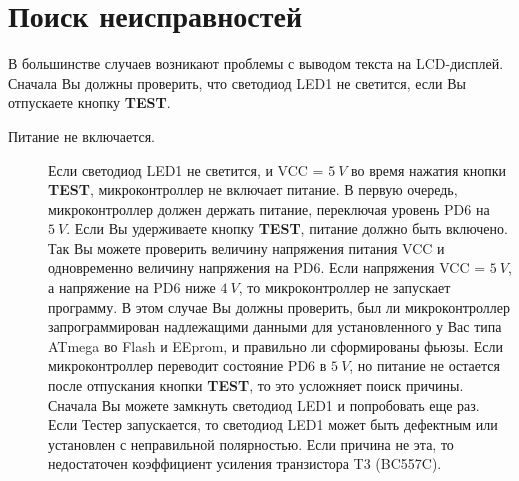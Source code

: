 \section{Поиск неисправностей }
В большинстве случаев возникают проблемы с выводом текста на LCD-дисплей. Сначала Вы должны проверить, что светодиод 
LED1 не светится, если Вы отпускаете кнопку \textbf{ TEST}. 
\begin{description}

\item[Питание не включается.]
Если светодиод LED1 не светится, и VCC = \(5~V\) во время нажатия кнопки \textbf{ TEST}, микроконтроллер не включает 
питание. 
В первую очередь, микроконтроллер должен держать питание, переключая уровень PD6 на \(5~V\). Если Вы удерживаете кнопку 
\textbf{ TEST}, питание должно быть включено.
Так Вы можете проверить величину напряжения питания VCC и одновременно величину 
напряжения на PD6. Если напряжения VCC = \(5~V\), а напряжение на PD6 ниже \(4~V\), то микроконтроллер не запускает программу. 
В этом случае Вы должны проверить, был ли микроконтроллер запрограммирован надлежащими данными для установленного у 
Вас типа ATmega во Flash и EEprom, и правильно ли сформированы фьюзы. Если микроконтроллер переводит состояние PD6 в 
\(5~V\), но питание не остается после отпускания кнопки \textbf{ TEST}, то это усложняет поиск причины. Сначала Вы можете замкнуть 
светодиод LED1 и попробовать еще раз. Если Тестер запускается, то светодиод LED1 может быть дефектным или установлен 
с неправильной полярностью. Если причина не эта, то недостаточен коэффициент усиления транзистора T3 (BC557C).


\end{description}
